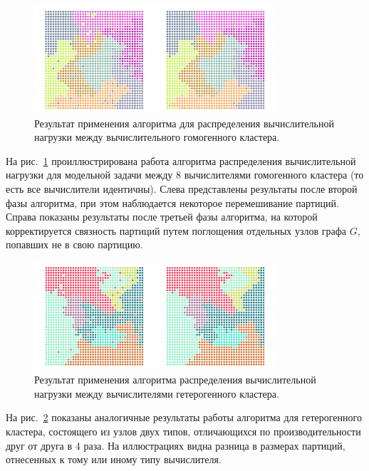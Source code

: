\begin{figure}[ht]
\centering
\includegraphics[width=0.8\textwidth]{./pics/text_2_getero/res1small.png}
\singlespacing
{}\caption{Результат применения алгоритма для распределения вычислительной нагрузки между вычислительного гомогенного кластера.}
\label{fig:text_2_getero_res1}
\end{figure}

На рис.~\ref{fig:text_2_getero_res1} проиллюстрирована работа алгоритма распределения вычислительной нагрузки для модельной задачи между 8 вычислителями гомогенного кластера (то есть все вычислители идентичны).
Слева представлены результаты после второй фазы алгоритма, при этом наблюдается некоторое перемешивание партиций.
Справа показаны результаты после третьей фазы алгоритма, на которой корректируется связность партиций путем поглощения отдельных узлов графа $G$, попавших не в свою партицию.

\begin{figure}[ht]
\centering
\includegraphics[width=0.8\textwidth]{./pics/text_2_getero/res2small.png}
\singlespacing
{}\caption{Результат применения алгоритма распределения вычислительной нагрузки между вычислителями гетерогенного кластера.}
\label{fig:text_2_getero_res2}
\end{figure}

На рис.~\ref{fig:text_2_getero_res2} показаны аналогичные результаты работы алгоритма для гетерогенного кластера, состоящего из узлов двух типов, отличающихся по производительности друг от друга в 4 раза.
На иллюстрациях видна разница в размерах партиций, отнесенных к тому или иному типу вычислителя.

